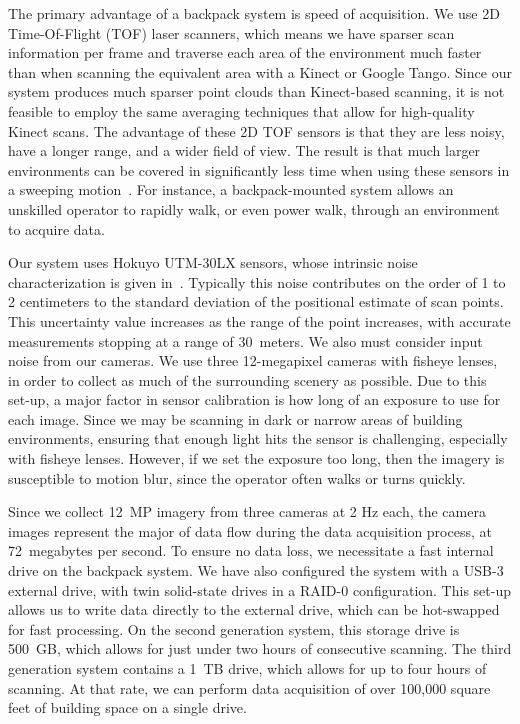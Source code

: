 \documentclass[12pt,onecolumn,oneside]{book}
\begin{document}
The primary advantage of a backpack system is speed of acquisition.  We use 2D Time-Of-Flight (TOF) laser scanners, which means we have sparser scan information per frame and traverse each area of the environment much faster than when scanning the equivalent area with a Kinect or Google Tango.  Since our system produces much sparser point clouds than Kinect-based scanning, it is not feasible to employ the same averaging techniques that allow for high-quality Kinect scans.  The advantage of these 2D TOF sensors is that they are less noisy, have a longer range, and a wider field of view.  The result is that much larger environments can be covered in significantly less time when using these sensors in a sweeping motion~\cite{Sweep}.  For instance, a backpack-mounted system allows an unskilled operator to rapidly walk, or even power walk, through an environment to acquire data.

Our system uses Hokuyo UTM-30LX sensors, whose intrinsic noise characterization is given in~\cite{Pomerleau12,Wong11}.  Typically this noise contributes on the order of 1 to 2 centimeters to the standard deviation of the positional estimate of scan points.  This uncertainty value increases as the range of the point increases, with accurate measurements stopping at a range of $30$~meters.  We also must consider input noise from our cameras.  We use three 12-megapixel cameras with fisheye lenses, in order to collect as much of the surrounding scenery as possible.  Due to this set-up, a major factor in sensor calibration is how long of an exposure to use for each image.  Since we may be scanning in dark or narrow areas of building environments, ensuring that enough light hits the sensor is challenging, especially with fisheye lenses.  However, if we set the exposure too long, then the imagery is susceptible to motion blur, since the operator often walks or turns quickly.

Since we collect 12~MP imagery from three cameras at 2 Hz each, the camera images represent the major of data flow during the data acquisition process, at 72~megabytes per second.  To ensure no data loss, we necessitate a fast internal drive on the backpack system.  We have also configured the system with a USB-3 external drive, with twin solid-state drives in a RAID-0 configuration.  This set-up allows us to write data directly to the external drive, which can be hot-swapped for fast processing.  On the second generation system, this storage drive is 500~GB, which allows for just under two hours of consecutive scanning.  The third generation system contains a 1~TB drive, which allows for up to four hours of scanning.  At that rate, we can perform data acquisition of over 100,000 square feet of building space on a single drive.
\end{document}
